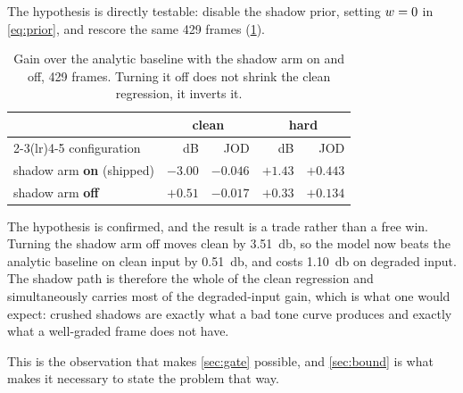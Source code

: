 The hypothesis is directly testable: disable the shadow prior, setting $w = 0$
in \cref{eq:prior}, and rescore the same 429 frames (\cref{tab:ablation}).

\begin{table}[htbp]
\centering
\caption{Gain over the analytic baseline with the shadow arm on and off, 429
frames. Turning it off does not shrink the clean regression, it inverts it.}
\label{tab:ablation}
\begin{tabular}{lrrrr}
\toprule
 & \multicolumn{2}{c}{clean} & \multicolumn{2}{c}{hard} \\
\cmidrule(lr){2-3}\cmidrule(lr){4-5}
configuration & dB & JOD & dB & JOD \\
\midrule
shadow arm \textbf{on} (shipped) & \textbf{$-3.00$} & $-0.046$ & \textbf{$+1.43$} & $+0.443$ \\
shadow arm \textbf{off}          & \textbf{$+0.51$} & $-0.017$ & $+0.33$ & $+0.134$ \\
\bottomrule
\end{tabular}
\end{table}

The hypothesis is confirmed, and the result is a trade rather than a free win.
Turning the shadow arm off moves clean by \SI{+3.51}{\decibel}, so the model now
beats the analytic baseline on clean input by \SI{0.51}{\decibel}, and costs
\SI{1.10}{\decibel} on degraded input. The shadow path is therefore the whole of
the clean regression and simultaneously carries most of the degraded-input gain,
which is what one would expect: crushed shadows are exactly what a bad tone
curve produces and exactly what a well-graded frame does not have.

This is the observation that makes \cref{sec:gate} possible, and
\cref{sec:bound} is what makes it necessary to state the problem that way.
